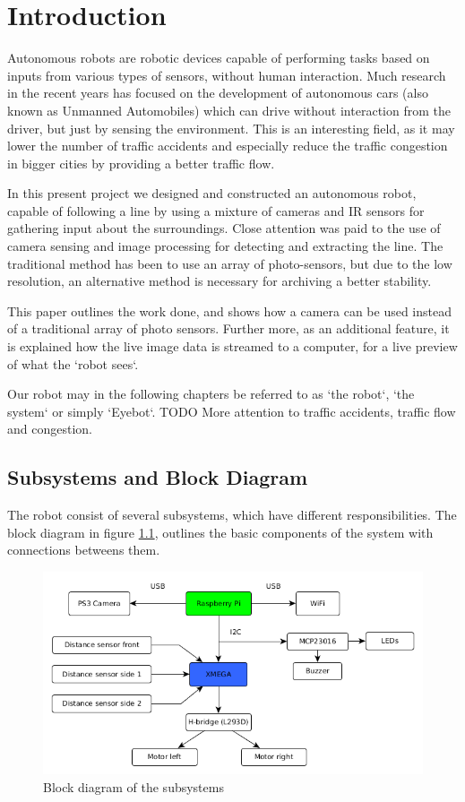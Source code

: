 \chapter{Introduction}

Autonomous robots are robotic devices capable of performing tasks based on inputs from various types of sensors, without human interaction. Much research in the recent years has focused on the development of autonomous cars (also known as Unmanned Automobiles) which can drive without interaction from the driver, but just by sensing the environment. This is an interesting field, as it may lower the number of traffic accidents and especially reduce the traffic congestion in bigger cities by providing a better traffic flow.

In this present project we designed and constructed an autonomous robot, capable of following a line by using a mixture of cameras and IR sensors for gathering input about the surroundings. Close attention was paid to the use of camera sensing and image processing for detecting and extracting the line. The traditional method has been to use an array of photo-sensors, but due to the low resolution, an alternative method is necessary for archiving a better stability.

This paper outlines the work done, and shows how a camera can be used instead of a traditional array of photo sensors. Further more, as an additional feature, it is explained how the live image data is streamed to a computer, for a live preview of what the `robot sees`.

Our robot may in the following chapters be referred to as `the robot`, `the system` or simply `Eyebot`.
TODO More attention to traffic accidents, traffic flow and congestion.

%
%
%
%
\section{Subsystems and Block Diagram}

The robot consist of several subsystems, which have different responsibilities. The block diagram in figure \ref{fig:intro_1}, outlines the basic components of the system with connections betweens them. 

\begin{figure}[!h]
	\centering
	\includegraphics[width=1\textwidth]{resources/Blockdiagram}
	\caption{Block diagram of the subsystems}
	\label{fig:intro_1}
\end{figure}

